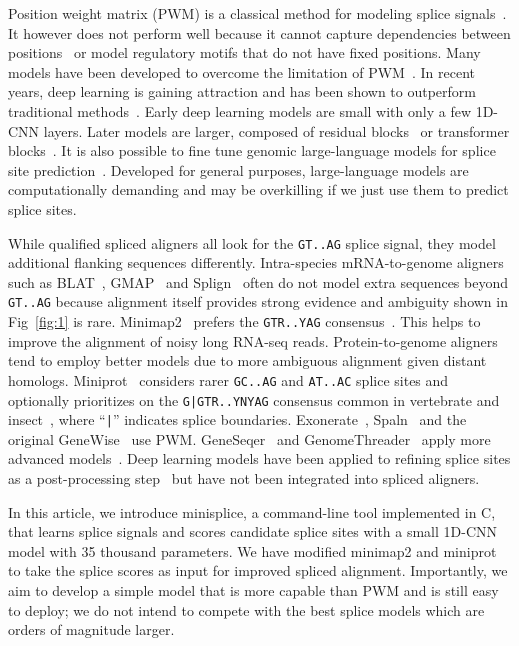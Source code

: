 \documentclass[webpdf,contemporary,large,namedate]{oup-authoring-template}%
\begin{document}
Position weight matrix (PWM) is a classical method for modeling splice signals~\citep{Staden:1984aa}.
It however does not perform well because it cannot capture dependencies between positions~\citep{Burge:1997uu}
or model regulatory motifs that do not have fixed positions.
Many models have been developed to overcome the limitation of PWM~\citep{Capitanchik:2025aa}.
In recent years, deep learning is gaining attraction
and has been shown to outperform traditional methods~\citep{Zhang:2018aa,DBLP:journals/access/DuYDZZL18,Albaradei:2020aa}.
Early deep learning models are small with only a few 1D-CNN layers.
Later models are larger, composed of residual blocks~\citep{Jaganathan:2019aa,Zeng:2022aa,Xu:2024aa,Chao:2024aa} or transformer blocks~\citep{You:2024aa,Chen:2024aa}.
It is also possible to fine tune genomic large-language models for splice site prediction~\citep{Nguyen:2023aa,Dalla-Torre:2025aa,Brixi2025.02.18.638918}.
Developed for general purposes, large-language models are computationally demanding and may be overkilling if we just use them to predict splice sites.

While qualified spliced aligners all look for the {\tt GT..AG} splice signal,
they model additional flanking sequences differently.
Intra-species mRNA-to-genome aligners such as BLAT~\citep{Kent:2002jk}, GMAP~\citep{Wu:2005vn} and Splign~\citep{Kapustin:2008tq} often do not model extra sequences beyond {\tt GT..AG}
because alignment itself provides strong evidence and ambiguity shown in Fig~\ref{fig:1} is rare.
Minimap2~\citep{Li:2018ab} prefers the {\tt GTR..YAG} consensus~\citep{Irimia:2008aa}.
This helps to improve the alignment of noisy long RNA-seq reads.
Protein-to-genome aligners tend to employ better models due to more ambiguous alignment given distant homologs.
Miniprot~\citep{Li:2023ab} considers rarer {\tt GC..AG} and {\tt AT..AC} splice sites and optionally prioritizes on the {\tt G|GTR..YNYAG} consensus
common in vertebrate and insect~\citep{Iwata:2011aa}, where ``{\tt |}'' indicates splice boundaries.
Exonerate~\citep{Slater:2005aa}, Spaln~\citep{Gotoh:2008aa,Iwata:2012aa,Gotoh:2024aa} and the original GeneWise~\citep{Birney:2004uy} use PWM.
GeneSeqer~\citep{Usuka:2000vi} and GenomeThreader~\citep{DBLP:journals/infsof/GremmeBSK05} apply more advanced models~\citep{Brendel:1998aa,Brendel:2004aa}.
Deep learning models have been applied to refining splice sites as a post-processing step~\citep{Chao:2024aa,Xia:2023aa}
but have not been integrated into spliced aligners.

In this article, we introduce minisplice, a command-line tool implemented in C,
that learns splice signals and scores candidate splice sites with a small 1D-CNN model with 35 thousand parameters.
We have modified minimap2 and miniprot to take the splice scores as input for improved spliced alignment.
Importantly, we aim to develop a simple model that is more capable than PWM and is still easy to deploy;
we do not intend to compete with the best splice models which are orders of magnitude larger.
\end{document}
